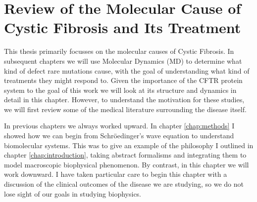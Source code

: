 \chapter{Review of the Molecular Cause of Cystic Fibrosis and Its Treatment}
\label{chap:cftr}
\newpage



This thesis primarily focusses on the molecular causes of Cystic Fibrosis. In subsequent chapters we will use Molecular Dynamics (MD) to determine what kind of defect rare mutations cause, with the goal of understanding what kind of treatments they might respond to. Given the importance of the CFTR protein system to the goal of this work we will look at its structure and dynamics in detail in this chapter. However, to understand the motivation for these studies, we will first review some of the medical literature surrounding the disease itself. 

In previous chapters we always worked upward. In chapter \ref{chap:methods} I showed how we can begin from Schr\"oedinger's wave equation to understand biomolecular systems. This was to give an example of the philosophy I outlined in chapter \ref{chap:introduction}, taking abstract formalisms and integrating them to model macroscopic biophysical phenomenon. By contrast, in this chapter we will work downward. I have taken particular care to begin this chapter with a discussion of the clinical outcomes of the disease we are studying, so we do not lose sight of our goals in studying biophysics. 

